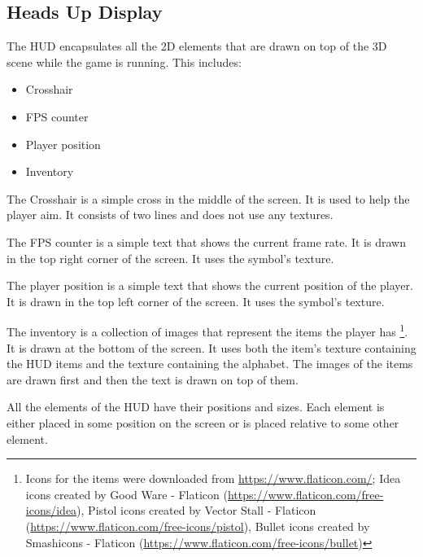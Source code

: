 \subsection{Heads Up Display} \label{sec:hud}
The HUD encapsulates all the 2D elements that are drawn on top of the 3D scene while the game is running.
This includes:
\begin{itemize}
    \item Crosshair
    \item FPS counter
    \item Player position
    \item Inventory
\end{itemize}

The Crosshair is a simple cross in the middle of the screen.
It is used to help the player aim.
It consists of two lines and does not use any textures.

The FPS counter is a simple text that shows the current frame rate.
It is drawn in the top right corner of the screen.
It uses the symbol's texture.

The player position is a simple text that shows the current position of the player.
It is drawn in the top left corner of the screen.
It uses the symbol's texture.

The inventory is a collection of images that represent the items the player has
\footnote{Icons for the items were downloaded from \url{https://www.flaticon.com/};
    Idea icons created by Good Ware - Flaticon (\url{https://www.flaticon.com/free-icons/idea}),
    Pistol icons created by Vector Stall - Flaticon (\url{https://www.flaticon.com/free-icons/pistol}),
    Bullet icons created by Smashicons - Flaticon (\url{https://www.flaticon.com/free-icons/bullet})}.
It is drawn at the bottom of the screen.
It uses both the item's texture containing the HUD items and the texture containing the alphabet.
The images of the items are drawn first and then the text is drawn on top of them.

All the elements of the HUD have their positions and sizes.
Each element is either placed in some position on the screen or is placed relative to some other element.